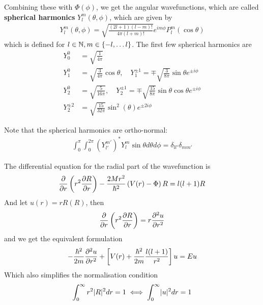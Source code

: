 Combining these with $\Phi(\phi)$, we get the angular wavefunctions, which are called \textbf{spherical harmonics} $Y_l^{m}(\theta,\phi)$, which are given by
\begin{align*}
	Y_l^{m}(\theta,\phi) = \sqrt{\frac{(2l+1)(l-m)!}{4\pi (l+m)!}} e^{im \phi}P_l^{m}(\cos \theta)
\end{align*}
which is defined for $l \in \mathbb{N}, m \in \{-l, \ldots l\}$.
The first few spherical harmonics are
\begin{align*}
	Y_0^{0} &= \sqrt{\frac{1}{4\pi}}\\
	Y_1^{0} &= \sqrt{\frac{3}{4\pi}} \cos \theta, \quad Y_1^{\pm 1} = \mp \sqrt{\frac{3}{8\pi}}\sin \theta e^{\pm i \phi}\\
	Y_2^{0} &= \sqrt{\frac{5}{16\pi}}, \quad Y_2^{\pm 1} = \mp \sqrt{\frac{15}{8\pi}} \sin \theta \cos \theta e^{\pm i \phi}\\
	Y_2^{\pm 2} &= \sqrt{\frac{15}{32\pi}}\sin^{2}(\theta)e^{\pm 2i \phi}
\end{align*}

Note that the spherical harmonics are ortho-normal:
\begin{align*}
	\int_{0}^{\pi}\int_{0}^{2 \pi} \left(Y_{l'}^{m'}\right)^\ast Y_{l}^{m} \sin \theta d \theta d \phi = \delta_{ll'}\delta_{mm'}
\end{align*}


The differential equation for the radial part of the wavefunction is
\begin{align*}
	\frac{\partial }{\partial r}\left(
		r^2 \frac{\partial R}{\partial r}
	\right) - \frac{2Mr^{2}}{\hbar^{2}}\left(
	V(r) - \Phi
	\right)
	R = l(l+1)R
\end{align*}
And let $u(r) = r R(R)$, then
\begin{align*}
	\frac{\partial }{\partial r}\left(
		r^{2} \frac{\partial R}{\partial r}
	\right) = r \frac{\partial^2 u}{\partial r^2}
\end{align*}
and we get the equivalent formulation
\begin{align*}
	-\frac{\hbar^{2}}{2m} \frac{\partial^2 u}{\partial r^2} + \left[V(r) + \frac{\hbar^{2}}{2m} \frac{l(l+1)}{r^2}\right] u = Eu
\end{align*}
Which also simplifies the normalisation condition
\begin{align*}
	\int_{0}^{\infty}r^2 \abs{R}^2 dr = 1 \iff \int_{0}^{\infty}\abs{u}^2 dr = 1
\end{align*}
